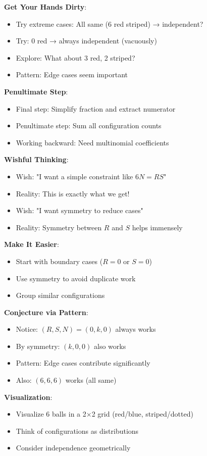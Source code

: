 \documentclass[12pt]{article}
\begin{document}
\begin{strategicbox}
\textbf{Get Your Hands Dirty}:
\begin{itemize}
    \item Try extreme cases: All same (6 red striped) → independent?
    \item Try: 0 red → always independent (vacuously)
    \item Explore: What about 3 red, 2 striped?
    \item Pattern: Edge cases seem important
\end{itemize}

\textbf{Penultimate Step}:
\begin{itemize}
    \item Final step: Simplify fraction and extract numerator
    \item Penultimate step: Sum all configuration counts
    \item Working backward: Need multinomial coefficients
\end{itemize}

\textbf{Wishful Thinking}:
\begin{itemize}
    \item Wish: "I want a simple constraint like $6N = RS$"
    \item Reality: This is exactly what we get!
    \item Wish: "I want symmetry to reduce cases"
    \item Reality: Symmetry between $R$ and $S$ helps immensely
\end{itemize}

\textbf{Make It Easier}:
\begin{itemize}
    \item Start with boundary cases ($R = 0$ or $S = 0$)
    \item Use symmetry to avoid duplicate work
    \item Group similar configurations
\end{itemize}

\textbf{Conjecture via Pattern}:
\begin{itemize}
    \item Notice: $(R, S, N) = (0, k, 0)$ always works
    \item By symmetry: $(k, 0, 0)$ also works
    \item Pattern: Edge cases contribute significantly
    \item Also: $(6, 6, 6)$ works (all same)
\end{itemize}

\textbf{Visualization}:
\begin{itemize}
    \item Visualize 6 balls in a 2×2 grid (red/blue, striped/dotted)
    \item Think of configurations as distributions
    \item Consider independence geometrically
\end{itemize}


\end{strategicbox}
\end{document}

